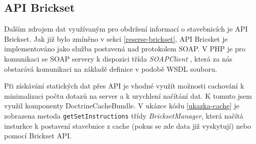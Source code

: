 
\subsection{API Brickset}
Dalším zdrojem dat využívaným pro obdržení informací o stavebnicích je API Brickset. Jak již bylo zmíněno v sekci \ref{reserse-brickset}, API Bricsket je implementováno jako služba postavená nad protokolem \gls{SOAP}. V PHP je pro komunikaci se SOAP servery k dispozici třída \textit{SOAPClient} \autocite{soapclient}, která za nás obstarává komunikaci na základě definice v podobě \gls{WSDL} souboru. 

Při získávání statických dat přes API je vhodné využít možnosti cachování k minimalizaci počtu dotazů na server a k urychlení načítání dat. K tomuto jsem využil komponenty DoctrineCacheBundle. V ukázce kódu \ref{ukazka-cache} je zobrazena metoda \texttt{getSetInstructions} třídy \textit{BricksetManager}, která načítá insturkce k postavení stavebnice z cache (pokus se zde data již vyskytují) nebo pomocí Brickset API. 

